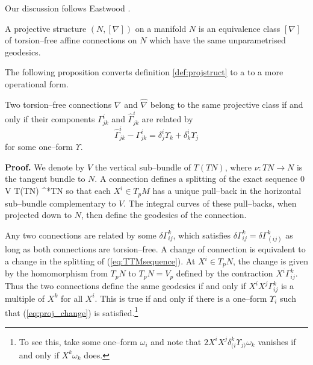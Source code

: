 Our discussion follows Eastwood \cite{Eastwood}.

\begin{defi}\label{def:projstruct} A projective structure $(N,[\nabla])$
on a manifold $N$ is an equivalence class $[\nabla]$ of torsion--free affine connections on $N$ which have the same unparametrised geodesics.
\end{defi}

The following proposition converts definition \ref{def:projstruct} to a to a more operational form.

\begin{prop} Two torsion--free connections $\nabla$ and $\widehat{\nabla}$ belong to the same projective class if and only if their components $\Gamma^i_{jk}$ and $\widehat{\Gamma}^i_{jk}$ are related by
\begin{equation}
\widehat{\Gamma}^i_{jk} - \Gamma^i_{jk} = \delta_{j}^{i}\Upsilon_{k}+\delta_{k}^{i}\Upsilon_{j}\label{eq:proj_change}
\end{equation}
for some one--form $\Upsilon.$
\end{prop}

{\bf Proof.} We denote by $V$ the vertical sub--bundle of $T(TN)$, where $\nu:TN\rightarrow N$ is the tangent bundle to $N$. A connection defines a splitting of the exact sequence
\be \label{eq:TTMsequence}
0 \longrightarrow V \longrightarrow T(TN) \longrightarrow \nu^*TN 
\ee
so that each $X^i\in T_pM$ has a unique pull--back in the horizontal sub--bundle complementary to $V$. The integral curves of these pull--backs, when projected down to $N$, then define the geodesics of the connection.

Any two connections are related by some $\delta\Gamma^k_{ij}$, which satisfies $\delta\Gamma^k_{ij}=\delta\Gamma^k_{(ij)}$ as long as both connections are torsion--free. A change of connection is equivalent to a change in the splitting of (\ref{eq:TTMsequence}). At $X^i\in T_pN$, the change is given by the homomorphism from $T_pN$ to $T_pN=V_p$ defined by the contraction $X^i\Gamma^k_{ij}$. Thus the two connections define the same geodesics if and only if $X^iX^j\Gamma^k_{ij}$ is a multiple of $X^k$ for all $X^i$. This is true if and only if there is a one--form $\Upsilon_i$ such that (\ref{eq:proj_change}) is satisfied.\footnote{To see this, take some one--form $\omega_i$ and note that $2X^iX^j\delta^k_{(i}\Upsilon_{j)}\omega_k$ vanishes if and only if $X^k\omega_k$ does.}
\koniec

